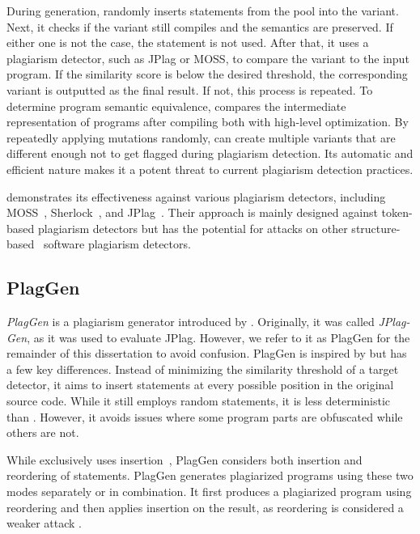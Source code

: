 During generation, \mossad randomly inserts statements from the pool into the variant.
Next, it checks if the variant still compiles and the semantics are preserved. If either one is not the case, the statement is not used.
After that, it uses a plagiarism detector, such as JPlag or MOSS, to compare the variant to the input program. If the similarity score is below the desired threshold, the corresponding variant is outputted as the final result. If not, this process is repeated.
%
To determine program semantic equivalence, \mossad compares the intermediate representation of programs after compiling both with high-level optimization. %
%
By repeatedly applying mutations randomly, \mossad can create multiple variants that are different enough not to get flagged during plagiarism detection.
Its automatic and efficient nature makes it a potent threat to current plagiarism detection practices.

\mossad demonstrates its effectiveness
against various plagiarism detectors, including MOSS~\cite{MOSS}, Sherlock~\cite{Joy1999}, and JPlag~\cite{prechelt2000,prechelt2002}.
Their approach is mainly designed against token-based plagiarism detectors but has the potential for attacks on other structure-based~\cite{Nichols2019} software plagiarism detectors.

\subsection{PlagGen}
\textit{PlagGen} is a plagiarism generator introduced by \textcite{Broedel2023}.
Originally, it was called \textit{JPlag-Gen}, as it was used to evaluate JPlag. However, we refer to it as PlagGen for the remainder of this dissertation to avoid confusion. PlagGen is inspired by \mossad but has a few key differences. Instead of minimizing the similarity threshold of a target detector, it aims to insert statements at every possible position in the original source code. While it still employs random statements, it is less deterministic than \mossad. However, it avoids issues where some program parts are obfuscated while others are not.

While \mossad exclusively uses insertion~\cite{DevoreMcDonald2020},  PlagGen considers both insertion and reordering of statements.
PlagGen generates plagiarized programs using these two modes separately or in combination.
It first produces a plagiarized program using reordering and then applies insertion on the result, as reordering is considered a weaker attack \cite{Broedel2023}.

